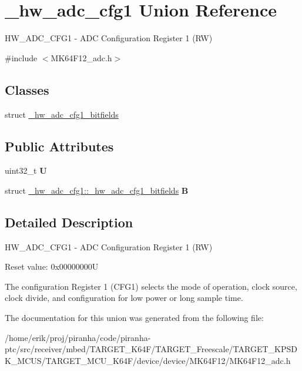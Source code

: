 \hypertarget{union__hw__adc__cfg1}{}\section{\+\_\+hw\+\_\+adc\+\_\+cfg1 Union Reference}
\label{union__hw__adc__cfg1}


H\+W\+\_\+\+A\+D\+C\+\_\+\+C\+F\+G1 -\/ A\+DC Configuration Register 1 (RW)  




{\ttfamily \#include $<$M\+K64\+F12\+\_\+adc.\+h$>$}

\subsection*{Classes}
\begin{DoxyCompactItemize}
\item 
struct \hyperlink{struct__hw__adc__cfg1_1_1__hw__adc__cfg1__bitfields}{\+\_\+hw\+\_\+adc\+\_\+cfg1\+\_\+bitfields}
\end{DoxyCompactItemize}
\subsection*{Public Attributes}
\begin{DoxyCompactItemize}
\item 
uint32\+\_\+t {\bfseries U}\hypertarget{union__hw__adc__cfg1_ae35029b36406541ff24250aa641012e6}{}\label{union__hw__adc__cfg1_ae35029b36406541ff24250aa641012e6}

\item 
struct \hyperlink{struct__hw__adc__cfg1_1_1__hw__adc__cfg1__bitfields}{\+\_\+hw\+\_\+adc\+\_\+cfg1\+::\+\_\+hw\+\_\+adc\+\_\+cfg1\+\_\+bitfields} {\bfseries B}\hypertarget{union__hw__adc__cfg1_a07463f53786c6c76b831fd2344a4b091}{}\label{union__hw__adc__cfg1_a07463f53786c6c76b831fd2344a4b091}

\end{DoxyCompactItemize}


\subsection{Detailed Description}
H\+W\+\_\+\+A\+D\+C\+\_\+\+C\+F\+G1 -\/ A\+DC Configuration Register 1 (RW) 

Reset value\+: 0x00000000U

The configuration Register 1 (C\+F\+G1) selects the mode of operation, clock source, clock divide, and configuration for low power or long sample time. 

The documentation for this union was generated from the following file\+:\begin{DoxyCompactItemize}
\item 
/home/erik/proj/piranha/code/piranha-\/ptc/src/receiver/mbed/\+T\+A\+R\+G\+E\+T\+\_\+\+K64\+F/\+T\+A\+R\+G\+E\+T\+\_\+\+Freescale/\+T\+A\+R\+G\+E\+T\+\_\+\+K\+P\+S\+D\+K\+\_\+\+M\+C\+U\+S/\+T\+A\+R\+G\+E\+T\+\_\+\+M\+C\+U\+\_\+\+K64\+F/device/device/\+M\+K64\+F12/M\+K64\+F12\+\_\+adc.\+h\end{DoxyCompactItemize}
